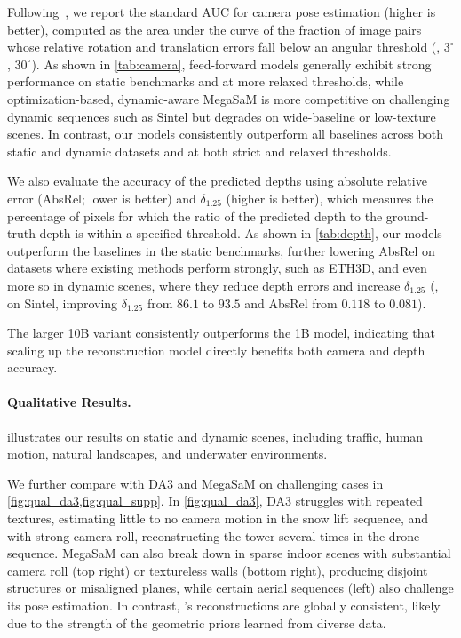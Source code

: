 Following~\cite{wang25vggt}, we report the standard AUC for camera pose estimation (higher is better), computed as the area under the curve of the fraction of image pairs whose relative rotation and translation errors fall below an angular threshold (\eg, $3^\circ$, $30^\circ$).
As shown in \cref{tab:camera}, feed-forward models generally exhibit strong performance on static benchmarks and at more relaxed thresholds, while optimization-based, dynamic-aware MegaSaM is more competitive on challenging dynamic sequences such as Sintel but degrades on wide-baseline or low-texture scenes.
In contrast, our models consistently outperform all baselines across both static and dynamic datasets and at both strict and relaxed thresholds.

We also evaluate the accuracy of the predicted depths using absolute relative error (AbsRel; lower is better) and $\delta_{1.25}$ (higher is better), which measures the percentage of pixels for which the ratio of the predicted depth to the ground-truth depth is within a specified threshold.
As shown in \cref{tab:depth}, our models outperform the baselines in the static benchmarks, further lowering AbsRel on datasets where existing methods perform strongly, such as ETH3D, and even more so in dynamic scenes, where they reduce depth errors and increase $\delta_{1.25}$ (\eg, on Sintel, improving $\delta_{1.25}$ from $86.1$ to $93.5$ and AbsRel from $0.118$ to $0.081$).

The larger 10B variant consistently outperforms the 1B model, indicating that scaling up the reconstruction model directly benefits both camera and depth accuracy.

\paragraph{Qualitative Results.}

 illustrates our results on static and dynamic scenes, including traffic, human motion, natural landscapes, and underwater environments.







We further compare \method with DA3 and MegaSaM on challenging cases in \cref{fig:qual_da3,fig:qual_supp}.
In \cref{fig:qual_da3}, DA3 struggles with repeated textures, estimating little to no camera motion in the snow lift sequence, and with strong camera roll, reconstructing the tower several times in the drone sequence.
MegaSaM can also break down in sparse indoor scenes with substantial camera roll (top right) or textureless walls (bottom right), producing disjoint structures or misaligned planes, while certain aerial sequences (left) also challenge its pose estimation.
In contrast, \method's reconstructions are globally consistent, likely due to the strength of the geometric priors learned from diverse data.


